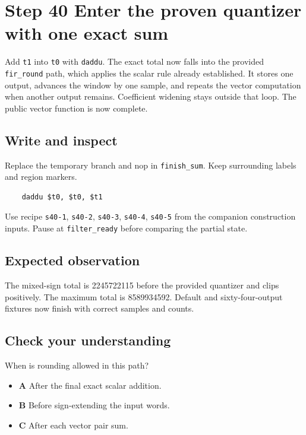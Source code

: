 \section{Step 40 Enter the proven quantizer with one exact sum}\label{fir-s40}

Add \texttt{t1} into \texttt{t0} with \texttt{daddu}. The exact total now falls into the provided \texttt{fir\_round} path, which applies the scalar rule already established. It stores one output, advances the window by one sample, and repeats the vector computation when another output remains. Coefficient widening stays outside that loop. The public vector function is now complete.

\subsection{Write and inspect}
Replace the temporary branch and nop in \texttt{finish\_sum}. Keep surrounding labels and region markers.

\begin{verbatim}
    daddu $t0, $t0, $t1
\end{verbatim}
Use recipe \texttt{s40-1}, \texttt{s40-2}, \texttt{s40-3}, \texttt{s40-4}, \texttt{s40-5} from the companion construction inputs. Pause at \texttt{filter\_ready} before comparing the partial state.

\subsection{Expected observation}
The mixed-sign total is 2245722115 before the provided quantizer and clips positively. The maximum total is 8589934592. Default and sixty-four-output fixtures now finish with correct samples and counts.

\subsection{Check your understanding}
When is rounding allowed in this path?

\begin{itemize}
  \item \textbf{A} After the final exact scalar addition.
  \item \textbf{B} Before sign-extending the input words.
  \item \textbf{C} After each vector pair sum.
\end{itemize}
